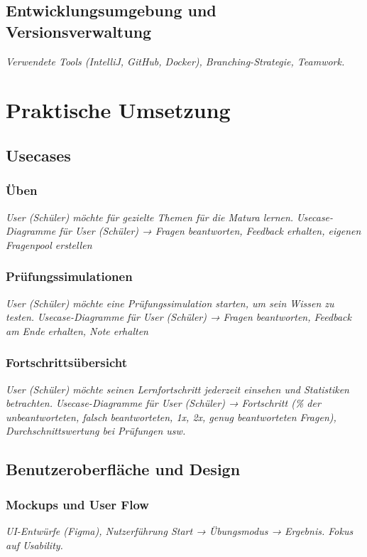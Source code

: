 \documentclass[12pt,a4paper,titlepage,listof=totoc,bibliography=totoc,chapteratlists=0pt]{scrreprt}
\begin{document}
\begin{spacing}{1}
\section{Entwicklungsumgebung und Versionsverwaltung}
\textit{Verwendete Tools (IntelliJ, GitHub, Docker), Branching-Strategie, Teamwork.}

\chapter{Praktische Umsetzung}

\section{Usecases}

\subsection{Üben}
\textit{User (Schüler) möchte für gezielte Themen für die Matura lernen.}
\textit{Usecase-Diagramme für User (Schüler) → Fragen beantworten, Feedback erhalten, eigenen Fragenpool erstellen}

\subsection{Prüfungssimulationen}
\textit{User (Schüler) möchte eine Prüfungssimulation starten, um sein Wissen zu testen.}
\textit{Usecase-Diagramme für User (Schüler) → Fragen beantworten, Feedback am Ende erhalten, Note erhalten}

\subsection{Fortschrittsübersicht}
\textit{User (Schüler) möchte seinen Lernfortschritt jederzeit einsehen und Statistiken betrachten.}
\textit{Usecase-Diagramme für User (Schüler) → Fortschritt (\% der unbeantworteten, falsch beantworteten, 1x, 2x, genug beantworteten Fragen), Durchschnittswertung bei Prüfungen usw.}

\section{Benutzeroberfläche und Design}

\subsection{Mockups und User Flow}
\textit{UI-Entwürfe (Figma), Nutzerführung Start → Übungsmodus → Ergebnis. Fokus auf Usability.}


\end{spacing}
\end{document}
